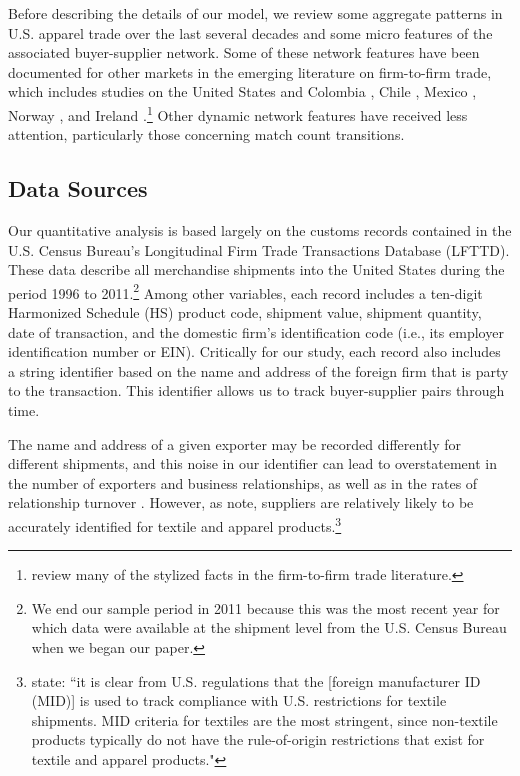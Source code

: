 \documentclass[12pt]{article} \usepackage{amsmath,amssymb,amsthm,geometry,graphicx,setspace,algorithm,algpseudocode,float}
\begin{document}
Before describing the details of our model, we review some aggregate patterns in U.S. apparel trade over the last several decades and some micro features of the associated buyer-supplier network. Some of these network features have been documented for other markets in the emerging literature on firm-to-firm trade, which includes studies on the United States and
Colombia \citep{eaton2008margins, eaton2014a, BernardMoxnesUlltveit2016}, Chile %
\citep{blum2010facts}, Mexico \citep{sugita2014assortative}, Norway %
\citep{BernardMoxnesUlltveit2016}, and Ireland \citep{fitzgerald2019exporters}.\footnote{%
\citet{BernardMoxnes2018} review many of the stylized facts in the firm-to-firm trade literature.\medskip 
} Other dynamic network features have received less attention, particularly those concerning match count transitions.

\subsection{Data Sources}
\label{sec:data_sources}
Our quantitative analysis is based largely on the customs records contained in the U.S. Census Bureau's Longitudinal Firm Trade Transactions Database (LFTTD). These data describe all merchandise shipments into the
United States during the period 1996 to 2011.\footnote{%
We end our sample period in 2011 because this was the most recent year for
which data were available at the shipment level from the U.S. Census Bureau
when we began our paper.\medskip} Among other variables, each record includes a ten-digit Harmonized Schedule (HS) product code, shipment value, shipment quantity, date of transaction, and the domestic firm's identification code (i.e., its employer identification number or EIN). Critically for our study, each record also includes a string identifier based on the name and address of the
foreign firm that is party to the transaction. This identifier allows us to track buyer-supplier pairs through time.

The name and address of a given exporter may be recorded differently for different shipments, and this noise in our identifier can lead to overstatement in the number of exporters and business relationships, as well as in the rates of relationship turnover  \citep{KamalMonarch2018, KrizanTyboutWangZhou2020}. However, as \citet{KamalMonarch2018} note, suppliers are relatively likely to be accurately identified for textile and apparel products.\footnote{%
 \citet{KamalMonarch2018} state: ``it is clear from U.S. regulations that the [foreign manufacturer ID (MID)] is used to track compliance with U.S. restrictions for textile shipments. MID criteria for textiles are the most stringent, since non-textile products typically do not have the rule-of-origin restrictions that exist for textile and apparel products."\medskip} 
\end{document}
